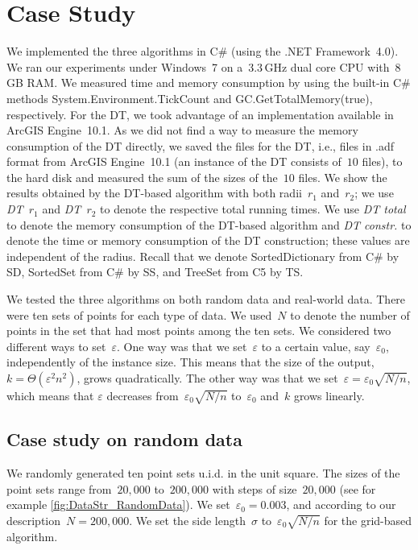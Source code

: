 \section{Case Study}\label{sec:DataStr_CaseStudy}
We implemented the three algorithms 
in C\# (using the .NET Framework~4.0).
We ran our experiments under 
Windows~7 on a~$3.3\,$GHz dual core CPU with~$8\,$GB RAM. 
We measured time and memory consumption by using 
the built-in C\# methods System.Environment.TickCount and 
GC.GetTotalMemory(true), respectively. 
For the DT, we took advantage of 
an implementation available in ArcGIS Engine~10.1.
As we did not find a way 
to measure the memory consumption of the DT directly, 
we saved the files for the DT, i.e., files in .adf format 
from ArcGIS Engine~10.1 
(an instance of the DT consists of~$10$ files), 
to the hard disk and 
measured the sum of the sizes of the~$10$ files. 
We show the results obtained by the DT-based algorithm 
with both radii~$r_{1}$ and~$r_{2}$; 
we use \emph{DT~$r_1$} and \emph{DT~$r_2$} 
to denote the respective total running times. 
We use \emph{DT total} to denote 
the memory consumption of the DT-based algorithm and 
\emph{DT constr.} to denote the time or memory consumption of 
the DT construction; 
these values are independent of the radius.
Recall that we denote SortedDictionary from C\# by SD,
SortedSet from C\# by SS, and TreeSet from C5 by TS.

We tested the three algorithms on both random data and 
real-world data. 
There were ten sets of points for each type of data. 
We used~$N$ to denote the number of points 
in the set that had most points among the ten sets. 
We considered two different ways to set~$\varepsilon$. 
One way was that we set~$\varepsilon$ to a certain value, 
say~$\varepsilon_{0}$, independently of the instance size. 
This means that the size of the output, 
$k=\Theta (\varepsilon ^{2}n^{2})$, grows quadratically. 
The other way was that 
we set~$\varepsilon =\varepsilon_{0}\sqrt{N/n}$, 
which means that $\varepsilon$ decreases 
from~$\varepsilon_{0}\sqrt{N/n}$ to~$\varepsilon_{0}$ 
and~$k$ grows linearly.



\subsection{Case study on random data}
\label{sec:DataStr_CaseStudy_RandomData} 
We randomly generated ten point sets u.i.d. in the unit square. 
The sizes of the point sets range from~$20{,}000$ to~$200{,}000$ 
with steps of size~$20{,}000$
(see for example \fig\ref{fig:DataStr_RandomData}). 
We set~$\varepsilon_{0}=0.003$, 
and according to our description~$N=200{,}000$. 
We set the side length~$\sigma$ to~$\varepsilon_{0}\sqrt{N/n}$
for the grid-based algorithm.

